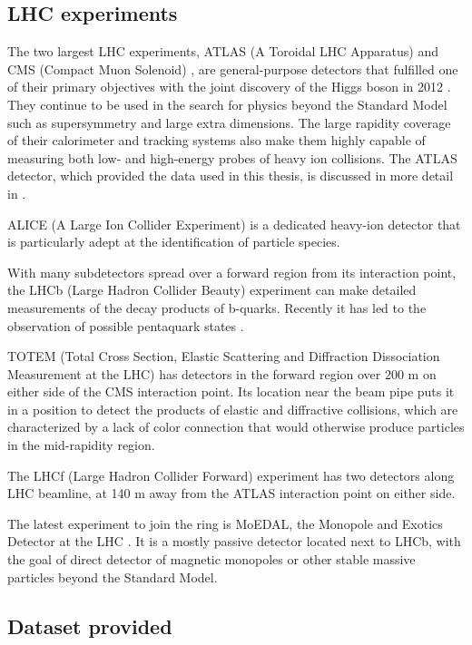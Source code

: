 \subsection{LHC experiments}
The two largest LHC experiments, ATLAS (A Toroidal LHC Apparatus) \cite{Aad:2008zzm} and CMS (Compact Muon Solenoid) \cite{Chatrchyan:2008aa}, are general-purpose detectors that fulfilled one of their primary objectives with the joint discovery of the Higgs boson in 2012 \cite{Aad:2012tfa,Chatrchyan:2012xdj}.
They continue to be used in the search for physics beyond the Standard Model such as supersymmetry and large extra dimensions.
The large rapidity coverage of their calorimeter and tracking systems also make them highly capable of measuring both low- and high-energy probes of heavy ion collisions.
The ATLAS detector, which provided the data used in this thesis, is discussed in more detail in .

ALICE (A Large Ion Collider Experiment) \cite{Aamodt:2008zz} is a dedicated heavy-ion detector that is particularly adept at the identification of particle species.

With many subdetectors spread over a forward region from its interaction point, the LHCb (Large Hadron Collider Beauty) experiment \cite{Alves:2008zz} can make detailed measurements of the decay products of b-quarks. Recently it has led to the observation of possible pentaquark states \cite{Aaij:2015tga}.

TOTEM (Total Cross Section, Elastic Scattering and Diffraction Dissociation Measurement at the LHC) \cite{Anelli:2008zza} has detectors in the forward region over 200 m on either side of the CMS interaction point.
Its location near the beam pipe puts it in a position to detect the products of elastic and diffractive collisions, which are characterized by a lack of color connection that would otherwise produce particles in the mid-rapidity region.

The LHCf (Large Hadron Collider Forward) experiment \cite{Adriani:2008zz} has two detectors along LHC beamline, at 140 m away from the ATLAS interaction point on either side.

The latest experiment to join the ring is MoEDAL, the Monopole and Exotics Detector at the LHC \cite{Acharya:2014nyr}.
It is a mostly passive detector located next to LHCb, with the goal of direct detector of magnetic monopoles or other stable massive particles beyond the Standard Model.

\subsection{Dataset provided}

